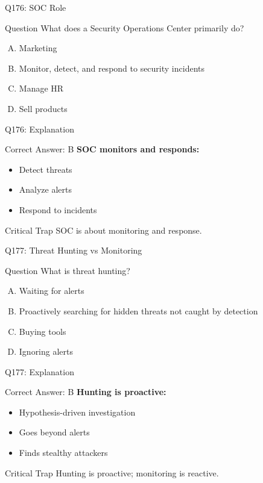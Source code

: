 \documentclass{beamer}
\begin{document}
	\begin{frame}{Q176: SOC Role}
		\begin{block}{Question}
			What does a Security Operations Center primarily do?
		\end{block}
		\begin{enumerate}[(A)]
			\item Marketing
			\item Monitor, detect, and respond to security incidents
			\item Manage HR
			\item Sell products
		\end{enumerate}
	\end{frame}
	
	\begin{frame}{Q176: Explanation}
		\begin{block}{Correct Answer: B}
			\textbf{SOC monitors and responds:}
			\begin{itemize}
				\item Detect threats
				\item Analyze alerts
				\item Respond to incidents
			\end{itemize}
		\end{block}
		\begin{alertblock}{Critical Trap}
			SOC is about monitoring and response.
		\end{alertblock}
	\end{frame}
	
	\begin{frame}{Q177: Threat Hunting vs Monitoring}
		\begin{block}{Question}
			What is threat hunting?
		\end{block}
		\begin{enumerate}[(A)]
			\item Waiting for alerts
			\item Proactively searching for hidden threats not caught by detection
			\item Buying tools
			\item Ignoring alerts
		\end{enumerate}
	\end{frame}
	
	\begin{frame}{Q177: Explanation}
		\begin{block}{Correct Answer: B}
			\textbf{Hunting is proactive:}
			\begin{itemize}
				\item Hypothesis-driven investigation
				\item Goes beyond alerts
				\item Finds stealthy attackers
			\end{itemize}
		\end{block}
		\begin{alertblock}{Critical Trap}
			Hunting is proactive; monitoring is reactive.
		\end{alertblock}
	\end{frame}
	
\end{document}
